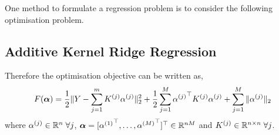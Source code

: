 One method to formulate a regression problem is to consider the following
optimisation problem.


\subsection{Additive Kernel Ridge Regression}
\label{sec:addKR}

Therefore the optimisation objective can be written as,
\begin{equation}
F({\bm{\alpha}}) = \frac{1}{2}\|Y - \sum_{j=1}^m K^{(j)} \alpha^{(j)}\|_2^2 + 
  \frac{1}{2} \sum_{j=1}^M {\alpha^{(j)}}^\top K^{(j)} \alpha^{(j)} +
  \sum_{j=1}^M \| \alpha^{(j)} \|_2
\label{eqn:optObjective}
\end{equation}
where $\alpha^{(j)} \in \mathbb{R}^n \; \forall j$, ${\bm{\alpha}} = [{\alpha^{(1)}}^\top, \dots, 
{\alpha^{(M)}}^\top]^\top  \in\mathbb{R}^{nM}$ and $K^{(j)} \in \mathbb{R}^{n\times n}\; \forall
j$.


